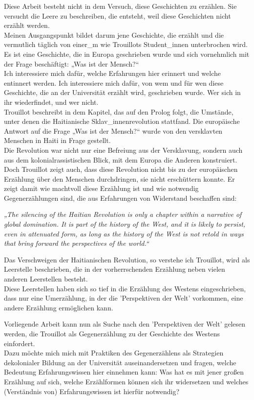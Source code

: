 \noindent Diese Arbeit besteht nicht in dem Versuch, diese Geschichten zu erzählen. Sie versucht die Leere zu beschreiben, die entsteht, weil diese Geschichten
nicht erzählt werden.\\

\noindent Meinen Ausgangspunkt bildet darum jene Geschichte, die erzählt und
die vermutlich täglich von einer\_m wie Trouillots Student\_innen unterbrochen
wird. Es ist eine Geschichte, die in Europa geschrieben wurde und sich
vornehmlich mit der Frage beschäftigt: „Was ist der Mensch?“ \\
Ich interessiere
mich dafür, welche Erfahrungen hier erinnert und welche entinnert werden. Ich
interessiere mich dafür, von wem und für wen diese Geschichte, die an der
Universität erzählt wird, geschrieben wurde. Wer sich in ihr wiederfindet, und
wer nicht.\\

Trouillot beschreibt in dem Kapitel, das auf den Prolog folgt, die Umstände,
unter denen die Haitianische Sklav\_innenrevolution stattfand. Die europäische
Antwort auf die Frage „Was ist der Mensch?“ wurde von den versklavten Menschen
in Haiti in Frage gestellt. \\
Die Revolution war nicht nur eine Befreiung aus der
Versklavung, sondern auch aus dem kolonialrassistischen Blick, mit dem Europa
die Anderen konstruiert. Doch Trouillot zeigt auch, dass diese Revolution nicht
bis zu der europäischen Erzählung über den Menschen durchdringen, sie nicht
erschüttern konnte. Er zeigt damit wie machtvoll diese Erzählung ist und wie
notwendig Gegenerzählungen sind, die aus Erfahrungen von Widerstand
beschaffen sind:
\begin{myenv}
  \textit{„The silencing of the Haitian Revolution is only a chapter within a
  narrative of global domination. It is part of the history of the West, and it
is likely to persist, even in attenuated form, as long as the history of the
West is not retold in ways that bring forward the perspectives of the
world.“\footnotemark{}}
\end{myenv}
Das Verschweigen der Haitianischen Revolution, so verstehe ich Trouillot, wird als Leerstelle beschrieben, die in der vorherrschenden Erzählung neben vielen anderen Leerstellen besteht.\\
Diese Leerstellen haben sich so tief in die Erzählung des Westens eingeschrieben, dass nur eine Umerzählung, in der die 'Perspektiven der Welt' vorkommen, eine andere Erzählung ermöglichen kann. 

\noindent Vorliegende Arbeit kann nun als Suche nach den 'Perspektiven der Welt' gelesen
werden, die Trouillot als Gegenerzählung zu der Geschichte des Westens
einfordert.\\
Dazu möchte mich mich mit Praktiken des Gegenerzählens als Strategien
dekolonialer Bildung an der Universität auseinandersetzen und fragen, welche
Bedeutung Erfahrungswissen hier einnehmen kann: Was hat es mit jener großen
Erzählung auf sich, welche Erzählformen können sich ihr widersetzen und welches
(Verständnis von) Erfahrungswissen ist hierfür notwendig?



